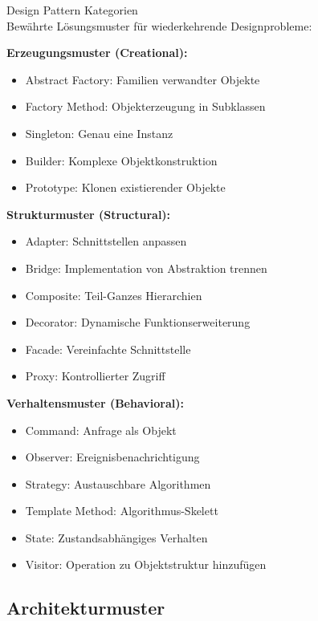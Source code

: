 \begin{concept}{Design Pattern Kategorien}\\
Bewährte Lösungsmuster für wiederkehrende Designprobleme:

\textbf{Erzeugungsmuster (Creational):}
\begin{itemize}
    \item Abstract Factory: Familien verwandter Objekte
    \item Factory Method: Objekterzeugung in Subklassen
    \item Singleton: Genau eine Instanz
    \item Builder: Komplexe Objektkonstruktion
    \item Prototype: Klonen existierender Objekte
\end{itemize}

\textbf{Strukturmuster (Structural):}
\begin{itemize}
    \item Adapter: Schnittstellen anpassen
    \item Bridge: Implementation von Abstraktion trennen
    \item Composite: Teil-Ganzes Hierarchien
    \item Decorator: Dynamische Funktionserweiterung
    \item Facade: Vereinfachte Schnittstelle
    \item Proxy: Kontrollierter Zugriff
\end{itemize}

\textbf{Verhaltensmuster (Behavioral):}
\begin{itemize}
    \item Command: Anfrage als Objekt
    \item Observer: Ereignisbenachrichtigung
    \item Strategy: Austauschbare Algorithmen
    \item Template Method: Algorithmus-Skelett
    \item State: Zustandsabhängiges Verhalten
    \item Visitor: Operation zu Objektstruktur hinzufügen
\end{itemize}
\end{concept}

\pagebreak




\subsection{Architekturmuster}

